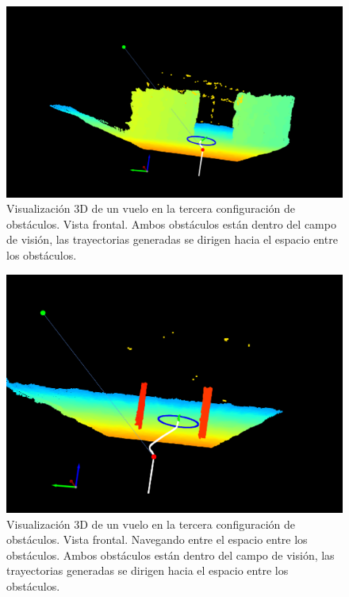 \begin{figure}[H]
    \centering
    \includegraphics[scale=0.25]{partes/img/depth-parallel-2-front.png}
    \caption[Visualización 3D de un vuelo en la tercera configuración de obstáculos. Vista frontal.]{Visualización 3D de un vuelo en la tercera configuración de obstáculos. Vista frontal. Ambos obstáculos están dentro del campo de visión, las trayectorias generadas se dirigen hacia el espacio entre los obstáculos.}
    \label{fig:depth-parallel-2}
\end{figure}

\begin{figure}[H]
    \centering
    \includegraphics[scale=0.32]{partes/img/depth-parallel-4-front-red.png}
    \caption[Visualización 3D de un vuelo en la tercera configuración de obstáculos. Vista frontal. Navegando entre el espacio entre los obstáculos.]{Visualización 3D de un vuelo en la tercera configuración de obstáculos. Vista frontal. Navegando entre el espacio entre los obstáculos. Ambos obstáculos están dentro del campo de visión, las trayectorias generadas se dirigen hacia el espacio entre los obstáculos.}
    \label{fig:depth-parallel-4}
\end{figure}

